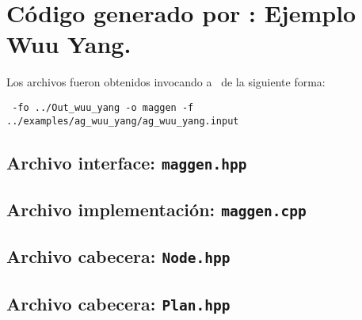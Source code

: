 \section{Código generado por \maggen: Ejemplo Wuu Yang.}
\label{append:agwuuyangcode}

Los archivos fueron obtenidos invocando a \maggen\ de la siguiente forma:

\begin{center}
\footnotesize
\texttt{\maggen\ -fo ../Out\_wuu\_yang -o maggen -f  ../examples/ag\_wuu\_yang/ag\_wuu\_yang.input}
\end{center}

\subsection{Archivo interface: \texttt{maggen.hpp}}
\label{append:maggenhpp}


\subsection{Archivo implementación: \texttt{maggen.cpp}}
\label{append:maggencpp}


\subsection{Archivo cabecera: \texttt{Node.hpp}}
\label{append:nodehpp}


\subsection{Archivo cabecera: \texttt{Plan.hpp}}
\label{append:planhpp}


\normalsize
